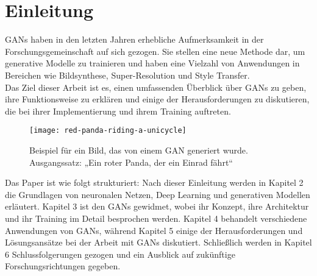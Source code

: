 \chapter{Einleitung}

\noindent \acfp{GAN} haben in den letzten Jahren erhebliche Aufmerksamkeit in der Forschungsgemeinschaft auf sich gezogen. Sie stellen eine neue Methode dar, um generative Modelle zu trainieren und haben eine Vielzahl von Anwendungen in Bereichen wie Bildsynthese, Super-Resolution und Style Transfer. \\

\noindent Das Ziel dieser Arbeit ist es, einen umfassenden Überblick über \acp{GAN} zu geben, ihre Funktionsweise zu erklären und einige der Herausforderungen zu diskutieren, die bei ihrer Implementierung und ihrem Training auftreten. \\

\begin{wrapfigure}{l}{0.50\textwidth}
    \centering
    \texttt{[image: red-panda-riding-a-unicycle]}
    \caption{Beispiel für ein Bild, das von einem \ac{GAN} generiert wurde. Ausgangssatz: „Ein roter Panda, der ein Einrad fährt“}
    \label{Abb:basic}
    \end{wrapfigure}

\hfill
\break
Das Paper ist wie folgt strukturiert: Nach dieser Einleitung werden in Kapitel 2 die Grundlagen von neuronalen Netzen, Deep Learning und generativen Modellen erläutert. Kapitel 3 ist den \acp{GAN} gewidmet, wobei ihr Konzept, ihre Architektur und ihr Training im Detail besprochen werden. Kapitel 4 behandelt verschiedene Anwendungen von \acp{GAN}, während Kapitel 5 einige der Herausforderungen und Lösungsansätze bei der Arbeit mit \acp{GAN} diskutiert. Schließlich werden in Kapitel 6 Schlussfolgerungen gezogen und ein Ausblick auf zukünftige Forschungsrichtungen gegeben. \\
